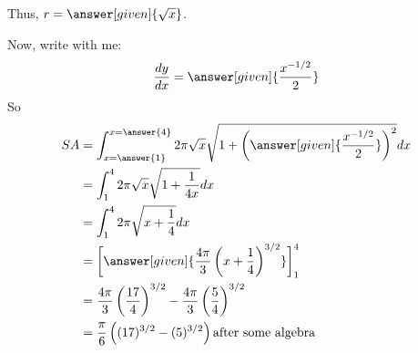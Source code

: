 \documentclass{ximera}
\begin{document}
\begin{example}
\begin{explanation}
    \begin{multipleChoice}
    \end{multipleChoice}

Thus, $r= \answer[given]{\sqrt{x}}$.
     
Now, write with me:
    \[
    \frac{dy}{dx} = \answer[given]{\frac{x^{-1/2}}{2}}
    \]
    So
    \begin{align*}
      SA &= \int_{x=\answer{1}}^{x=\answer{4}} 2\pi \sqrt{x} \sqrt{1 + \left(\answer[given]{\frac{x^{-1/2}}{2}}\right)^2} dx\\
      &= \int_1^4 2\pi \sqrt{x} \sqrt{1 + \frac{1}{4x}} dx\\
      &= \int_1^4 2\pi \sqrt{x+\frac{1}{4}} dx\\
      &= \bigg[\answer[given]{\frac{4\pi}{3}\left(x+\frac{1}{4}\right)^{3/2}}\bigg]_1^4\\
      &= \frac{4\pi}{3}\left(\frac{17}{4}\right)^{3/2}  - \frac{4\pi}{3}\left(\frac{5}{4}\right)^{3/2} \\
      &= \frac{\pi}{6} \left((17)^{3/2}-(5)^{3/2} \right) \textrm{after some algebra} 
    \end{align*}
  \end{explanation}
\end{example}
\end{document}
